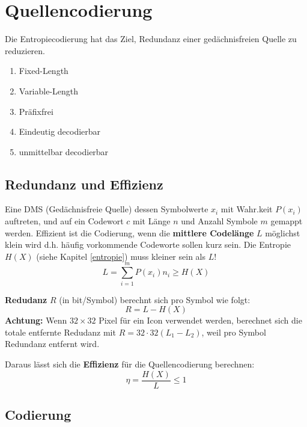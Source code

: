 \section{Quellencodierung}
Die Entropiecodierung hat das Ziel, Redundanz einer gedächnisfreien Quelle zu reduzieren. 
\begin{enumerate}[nosep]
	\item Fixed-Length
	\item Variable-Length
	\item Präfixfrei
	\item Eindeutig decodierbar
	\item unmittelbar decodierbar
\end{enumerate}

\subsection{Redundanz und Effizienz}
 Eine DMS (Gedächnisfreie Quelle) dessen Symbolwerte $x_i$ mit Wahr.keit $P(x_i)$ auftreten, und auf ein Codewort $c$ mit Länge $n$ und Anzahl Symbole $m$ gemappt werden. Effizient ist die Codierung, wenn die \textbf{mittlere Codelänge} $L$ möglichst klein wird d.h. häufig vorkommende Codeworte sollen kurz sein. Die Entropie $H(X)$ (siehe Kapitel \ref{entropie}) muss kleiner sein als $L$!
\[
L = \sum_{i=1}^{m}P(x_i)n_i \ge H(X)
\]

\noindent\textbf{Redudanz} $R$ (in bit/Symbol) berechnt sich pro Symbol wie folgt:
\[
R = L - H(X)
\]
\textbf{Achtung:} Wenn $32\times32$ Pixel für ein Icon verwendet werden, berechnet sich die totale entfernte Redudanz mit $R = 32\cdot32(L_1 - L_2)$, weil pro Symbol Redundanz entfernt wird.


\noindent Daraus lässt sich die \textbf{Effizienz} für die Quellencodierung berechnen:
\[
\eta = \frac{H(X)}{L} \le 1
\]

\subsection{Codierung}
